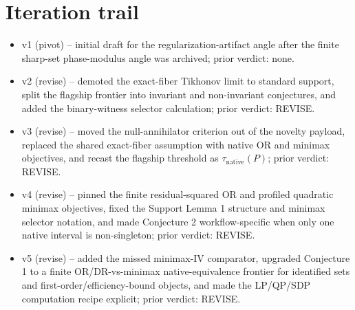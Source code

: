 \documentclass[11pt]{article}
\theoremstyle{definition}
\theoremstyle{plain}
\theoremstyle{remark}
\begin{document}
\section{Iteration trail}
\begin{itemize}[leftmargin=*]
\item v1 (pivot) -- initial draft for the regularization-artifact angle after
the finite sharp-set phase-modulus angle was archived; prior verdict: none.
\item v2 (revise) -- demoted the exact-fiber Tikhonov limit to standard
support, split the flagship frontier into invariant and non-invariant
conjectures, and added the binary-witness selector calculation; prior verdict:
REVISE.
\item v3 (revise) -- moved the null-annihilator criterion out of the novelty
payload, replaced the shared exact-fiber assumption with native OR and
minimax objectives, and recast the flagship threshold as
\(\tau_{\mathrm{native}}(P)\); prior verdict: REVISE.
\item v4 (revise) -- pinned the finite residual-squared OR and profiled
quadratic minimax objectives, fixed the Support Lemma 1 structure and
minimax selector notation, and made Conjecture 2 workflow-specific when only
one native interval is non-singleton; prior verdict: REVISE.
\item v5 (revise) -- added the missed minimax-IV comparator, upgraded
Conjecture 1 to a finite OR/DR-vs-minimax native-equivalence frontier for
identified sets and first-order/efficiency-bound objects, and made the
LP/QP/SDP computation recipe explicit; prior verdict: REVISE.
\end{itemize}
\end{document}
